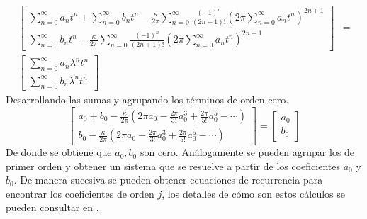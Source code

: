 \begin{align*}
	\left[
	\begin{array}{c}
		\sum_{n=0}^{\infty}a_{n}t^{n} + \sum_{n=0}^{\infty}b_{n}t^{n}-\frac{\kappa}{2\pi}\sum_{n=0}^{\infty}\frac{(-1)^{n}}{(2n+1)!}\left(2\pi \sum_{n=0}^{\infty}a_{n}t^{n}\right)^{2n+1}\\
		\sum_{n=0}^{\infty}b_{n}t^{n}-\frac{\kappa}{2\pi}\sum_{n=0}^{\infty}\frac{(-1)^{n}}{(2n+1)!}\left(2\pi\sum_{n=0}^{\infty}a_{n}t^{n}\right)^{2n+1}
	\end{array}	\right]
	&=\\
	\left[
	\begin{array}{c}
		\sum_{n=0}^{\infty}a_{n}\lambda^{n}t^{n} \\
		\sum_{n=0}^{\infty}b_{n}\lambda^{n}t^{n}
	\end{array}
	\right]
\end{align*}
Desarrollando las sumas y agrupando los t\'erminos de orden cero.
\begin{equation}
	\left[
	\begin{array}{c}
	
			a_{0}+b_{0}-\frac{\kappa}{2\pi}\left(2\pi a_{0}-\frac{2\pi}{3!} 	a_{0}^{3}+\frac{2\pi}{5!} a_{0}^{5}-\cdots
			\right)\\
			b_{0}-\frac{\kappa}{2\pi}\left(2\pi a_{0}-\frac{2\pi}{3!}a_{0}^{3}+\frac{2\pi}{5!}a_{0}^{5}-\cdots\right)
	\end{array}
	\right]=
	\left[
	\begin{array}{c}
		a_{0}\\
		b_{0}
	\end{array}
	\right]
\end{equation}
De donde se obtiene que $a_{0},b_{0}$ son cero. An\'alogamente se pueden agrupar los de primer orden y obtener un sistema que se resuelve a partir de los coeficientes $a_{0}$ y $b_{0}$. De manera sucesiva se pueden obtener ecuaciones de recurrencia para encontrar los coeficientes de orden $j$, los detalles de c\'omo son estos c\'alculos se pueden consultar en \cite{eve}.


